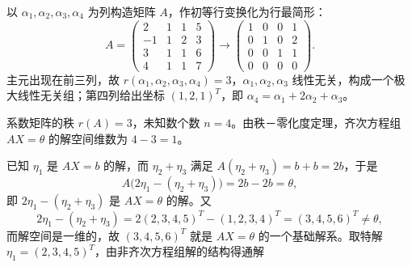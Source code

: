 \begin{solution}
以 $\alpha_1,\alpha_2,\alpha_3,\alpha_4$ 为列构造矩阵 $A$，作初等行变换化为行最简形：
\[
A=\begin{pmatrix}2&1&1&5\\-1&1&2&3\\3&1&1&6\\4&1&1&7\end{pmatrix}
\to\begin{pmatrix}1&0&0&1\\0&1&0&2\\0&0&1&1\\0&0&0&0\end{pmatrix}.
\]
主元出现在前三列，故 $r(\alpha_1,\alpha_2,\alpha_3,\alpha_4)=3$，$\alpha_1,\alpha_2,\alpha_3$ 线性无关，构成一个极大线性无关组；第四列给出坐标 $(1,2,1)^{T}$，即 $\alpha_4=\alpha_1+2\alpha_2+\alpha_3$。
\end{solution}

\begin{solution}
系数矩阵的秩 $r(A)=3$，未知数个数 $n=4$。由秩－零化度定理，齐次方程组 $AX=\theta$ 的解空间维数为 $4-3=1$。

已知 $\eta_1$ 是 $AX=b$ 的解，而 $\eta_2+\eta_3$ 满足 $A(\eta_2+\eta_3)=b+b=2b$，于是
\[
A\bigl(2\eta_1-(\eta_2+\eta_3)\bigr)=2b-2b=\theta,
\]
即 $2\eta_1-(\eta_2+\eta_3)$ 是 $AX=\theta$ 的解。又
\[
2\eta_1-(\eta_2+\eta_3)=2(2,3,4,5)^{T}-(1,2,3,4)^{T}=(3,4,5,6)^{T}\ne\theta,
\]
而解空间是一维的，故 $(3,4,5,6)^{T}$ 就是 $AX=\theta$ 的一个基础解系。取特解 $\eta_1=(2,3,4,5)^{T}$，由非齐次方程组解的结构得通解
\end{solution}

